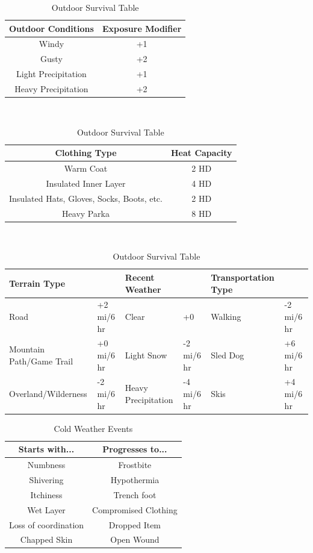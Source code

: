 \documentclass[notitlepage]{article}
\begin{document}
\begin{multicols}{2}
\begin{table}[t]
  \centering \large
  \begin{tabular}{|c||c|}
    \hline Outdoor Conditions & Exposure Modifier \\ \hline
    Windy & +1 \\
    Gusty & +2 \\
    Light Precipitation & +1 \\
    Heavy Precipitation & +2 \\ \hline
  \end{tabular} \\

  \begin{tabular}{|c||c|}
    \hline Clothing Type & Heat Capacity \\ \hline
    Warm Coat & 2 HD \\
    Insulated Inner Layer & 4 HD \\
    Insulated Hats, Gloves, Socks, Boots, etc. & 2 HD \\
    Heavy Parka & 8 HD \\ \hline
  \end{tabular} \\

  \begin{tabular}{|p{}|l||p{}|l||p{}|l|}
    \hline Terrain Type & & Recent Weather & & Transportation Type & \\ \hline
    Road & +2 mi/6 hr & Clear& +0 & Walking & -2 mi/6 hr \\
    Mountain Path/Game Trail & +0 mi/6 hr & Light Snow & -2 mi/6 hr & Sled Dog & +6 mi/6 hr \\
    Overland/Wilderness & -2 mi/6 hr & Heavy Precipitation & -4 mi/6 hr & Skis & +4 mi/6 hr \\ \hline
  \end{tabular}
  \caption{Outdoor Survival Table}
  \label{tab:outdoor-survival}
\end{table}

\begin{table}[t]
  \centering
  \begin{tabular}{|c|c|}
    \hline Starts with... & Progresses to... \\ \hline
    Numbness & Frostbite \\
    Shivering & Hypothermia \\
    Itchiness & Trench foot \\
    Wet Layer & Compromised Clothing \\ 
    Loss of coordination & Dropped Item \\
    Chapped Skin & Open Wound \\ \hline
  \end{tabular}
  \caption{Cold Weather Events}
  \label{tab:cold-events}
\end{table}


\end{multicols}
\end{document}
